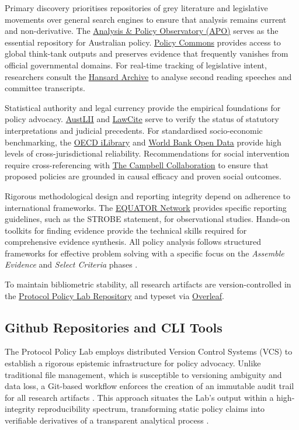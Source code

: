 \documentclass[12pt, a4paper]{article}
\begin{document}
Primary discovery prioritises repositories of grey literature and legislative movements over general search engines to ensure that analysis remains current and non-derivative. The \href{https://apo.org.au/}{Analysis \& Policy Observatory (APO)} serves as the essential repository for Australian policy. \href{https://policycommons.net/}{Policy Commons} provides access to global think-tank outputs and preserves evidence that frequently vanishes from official governmental domains. For real-time tracking of legislative intent, researchers consult the \href{https://www.aph.gov.au/Parliamentary_Business/Hansard}{Hansard Archive} to analyse second reading speeches and committee transcripts.

Statistical authority and legal currency provide the empirical foundations for policy advocacy. \href{https://www.austlii.edu.au/}{AustLII} and \href{https://www.austlii.edu.au/lawcite/}{LawCite} serve to verify the status of statutory interpretations and judicial precedents. For standardised socio-economic benchmarking, the \href{https://www.oecd-ilibrary.org/}{OECD iLibrary} and \href{https://data.worldbank.org/}{World Bank Open Data} provide high levels of cross-jurisdictional reliability. Recommendations for social intervention require cross-referencing with \href{https://www.campbellcollaboration.org/}{The Campbell Collaboration} to ensure that proposed policies are grounded in causal efficacy and proven social outcomes.

Rigorous methodological design and reporting integrity depend on adherence to international frameworks. The \href{https://www.equator-network.org/}{EQUATOR Network} provides specific reporting guidelines, such as the STROBE statement, for observational studies. Hands-on toolkits for finding evidence provide the technical skills required for comprehensive evidence synthesis. All policy analysis follows structured frameworks for effective problem solving with a specific focus on the \textit{Assemble Evidence} and \textit{Select Criteria} phases \citep{de_brun_searching_2014, bardach_practical_2024}.

To maintain bibliometric stability, all research artifacts are version-controlled in the \href{https://github.com/ZacKienzle2/ProtocolPolicyLab}{Protocol Policy Lab Repository} and typeset via \href{https://www.overleaf.com/}{Overleaf}.

\subsection{Github Repositories and CLI Tools}
The Protocol Policy Lab employs distributed Version Control Systems (VCS) to establish a rigorous epistemic infrastructure for policy advocacy. Unlike traditional file management, which is susceptible to versioning ambiguity and data loss, a Git-based workflow enforces the creation of an immutable audit trail for all research artifacts \citep{ram_git_2013}. This approach situates the Lab's output within a high-integrity reproducibility spectrum, transforming static policy claims into verifiable derivatives of a transparent analytical process \citep{peng_reproducible_2011}.
\end{document}

